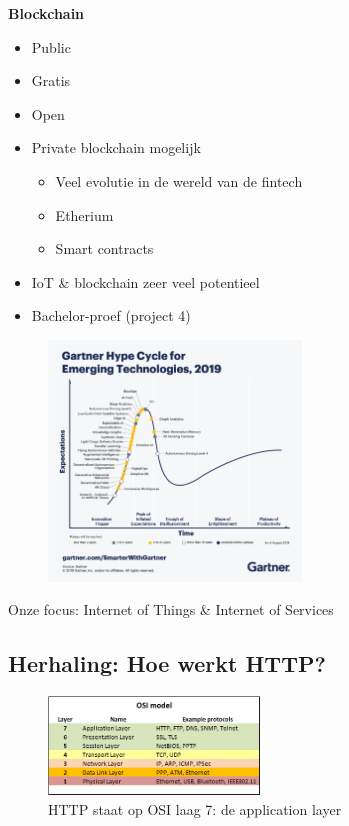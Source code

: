 \documentclass{article}
\newcommand{\bold}[1]{\textbf{#1}}
\begin{document}
\bold{Blockchain}
\begin{itemize}
    \item Public
    \item Gratis
    \item Open
\end{itemize}

\begin{itemize}
    \item Private blockchain mogelijk
    \begin{itemize}
        \item Veel evolutie in de wereld van de fintech
        \item Etherium
        \item Smart contracts
    \end{itemize}
    \item IoT \& blockchain zeer veel potentieel
    \item Bachelor-proef (project 4)
\end{itemize}

\begin{figure}[H]
    \centering
    \includegraphics[width=0.6\textwidth]{gartner-hype-cycle.png}
    \caption{}
\end{figure}

Onze focus: Internet of Things \& Internet of Services

\subsection{Herhaling: Hoe werkt HTTP?}
\begin{figure}[H]
    \centering
    \includegraphics[width=0.5\textwidth]{osi.png}
    \caption{HTTP staat op OSI laag 7: de application layer}
\end{figure}
\end{document}

